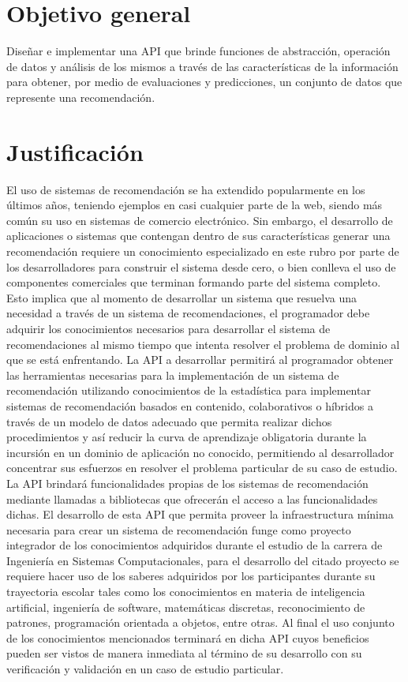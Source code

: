   \section {Objetivo general}
    Diseñar e implementar una API que brinde funciones de abstracción, operación de datos y análisis de los mismos a través de las características de la información para obtener, por medio de evaluaciones y predicciones, un conjunto de datos que represente una recomendación.

  \section{Justificación}
    El uso de sistemas de recomendación se ha extendido popularmente en los últimos años, teniendo ejemplos en casi cualquier parte de la web, siendo más común su uso en sistemas de comercio electrónico. Sin embargo, el desarrollo de aplicaciones o sistemas que contengan dentro de sus características generar una recomendación requiere un conocimiento especializado en este rubro por parte de los desarrolladores para construir el sistema desde cero, o bien conlleva el uso de componentes comerciales que terminan formando parte del sistema completo. Esto implica que al momento de desarrollar un sistema que resuelva una necesidad a través de un sistema de recomendaciones, el programador debe adquirir los conocimientos necesarios para desarrollar el sistema de recomendaciones al mismo tiempo que intenta resolver el problema de dominio al que se está enfrentando. La API a desarrollar permitirá al programador obtener las herramientas necesarias para la implementación de un sistema de recomendación utilizando conocimientos de la estadística para implementar sistemas de recomendación basados en contenido, colaborativos o híbridos a través de un modelo de datos adecuado que permita realizar dichos procedimientos y así reducir la curva de aprendizaje obligatoria durante la incursión en un dominio de aplicación no conocido, permitiendo al desarrollador concentrar sus esfuerzos en resolver el problema particular de su caso de estudio. \\

    La API brindará funcionalidades propias de los sistemas de recomendación mediante llamadas a bibliotecas que ofrecerán el acceso a las funcionalidades dichas. El desarrollo de esta API que permita proveer la infraestructura mínima necesaria para crear un sistema de recomendación funge como proyecto integrador de los conocimientos adquiridos durante el estudio de la carrera de Ingeniería en Sistemas Computacionales, para el desarrollo del citado proyecto se requiere hacer uso de los saberes adquiridos por los participantes durante su trayectoria escolar tales como los conocimientos en materia de inteligencia artificial, ingeniería de software, matemáticas discretas, reconocimiento de patrones, programación orientada a objetos, entre otras. Al final el uso conjunto de los conocimientos mencionados terminará en dicha API cuyos beneficios pueden ser vistos de manera inmediata al término de su desarrollo con su verificación y validación en un caso de estudio particular.
